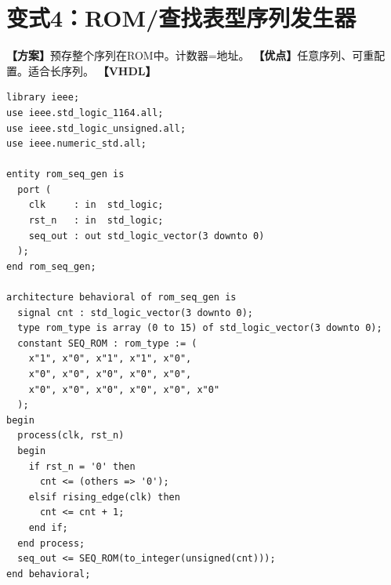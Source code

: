 \section{变式4：ROM/查找表型序列发生器}

\begin{detailbox}[完整教学]
\textbf{【方案】}预存整个序列在ROM中。计数器=地址。
\textbf{【优点】}任意序列、可重配置。适合长序列。
\textbf{【VHDL】}
\begin{lstlisting}
library ieee;
use ieee.std_logic_1164.all;
use ieee.std_logic_unsigned.all;
use ieee.numeric_std.all;

entity rom_seq_gen is
  port (
    clk     : in  std_logic;
    rst_n   : in  std_logic;
    seq_out : out std_logic_vector(3 downto 0)
  );
end rom_seq_gen;

architecture behavioral of rom_seq_gen is
  signal cnt : std_logic_vector(3 downto 0);
  type rom_type is array (0 to 15) of std_logic_vector(3 downto 0);
  constant SEQ_ROM : rom_type := (
    x"1", x"0", x"1", x"1", x"0",
    x"0", x"0", x"0", x"0", x"0",
    x"0", x"0", x"0", x"0", x"0", x"0"
  );
begin
  process(clk, rst_n)
  begin
    if rst_n = '0' then
      cnt <= (others => '0');
    elsif rising_edge(clk) then
      cnt <= cnt + 1;
    end if;
  end process;
  seq_out <= SEQ_ROM(to_integer(unsigned(cnt)));
end behavioral;
\end{lstlisting}
\end{detailbox}
